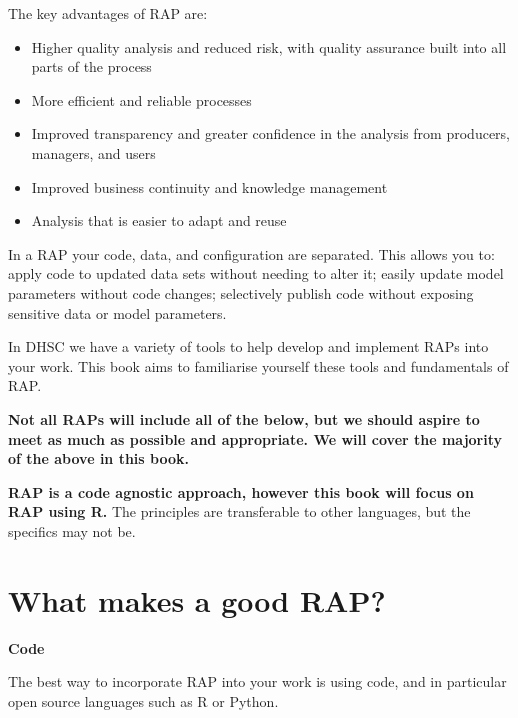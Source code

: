\documentclass[
  letterpaper,
]{book}
\begin{document}
The key advantages of RAP are:

\begin{itemize}
\item
  Higher quality analysis and reduced risk, with quality assurance built
  into all parts of the process
\item
  More efficient and reliable processes
\item
  Improved transparency and greater confidence in the analysis from
  producers, managers, and users
\item
  Improved business continuity and knowledge management
\item
  Analysis that is easier to adapt and reuse
\end{itemize}

In a RAP your code, data, and configuration are separated. This allows
you to: apply code to updated data sets without needing to alter it;
easily update model parameters without code changes; selectively publish
code without exposing sensitive data or model parameters.

In DHSC we have a variety of tools to help develop and implement RAPs
into your work. This book aims to familiarise yourself these tools and
fundamentals of RAP.

\textbf{Not all RAPs will include all of the below, but we should aspire
to meet as much as possible and appropriate. We will cover the majority
of the above in this book.}

\textbf{RAP is a code agnostic approach, however this book will focus on
RAP using R.} The principles are transferable to other languages, but
the specifics may not be.

\hypertarget{what-makes-a-good-rap}{%
\section{What makes a good RAP?}\label{what-makes-a-good-rap}}

\textbf{Code}

The best way to incorporate RAP into your work is using code, and in
particular open source languages such as R or Python.
\end{document}
